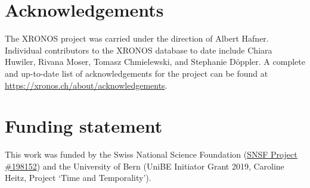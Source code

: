 \documentclass[
  number,
  doubleblind]{elsarticle}
\begin{document}
\section{Acknowledgements}\label{acknowledgements}

The XRONOS project was carried under the direction of Albert Hafner.
Individual contributors to the XRONOS database to date include Chiara
Huwiler, Rivana Moser, Tomasz Chmielewski, and Stephanie Döppler. A
complete and up-to-date list of acknowledgements for the project can be
found at \url{https://xronos.ch/about/acknowledgements}.

\section{Funding statement}\label{funding-statement}

This work was funded by the Swiss National Science Foundation
(\href{https://data.snf.ch/grants/grant/198153}{SNSF Project \#198152})
and the University of Bern (UniBE Initiator Grant 2019, Caroline Heitz,
Project `Time and Temporality').
\end{document}
